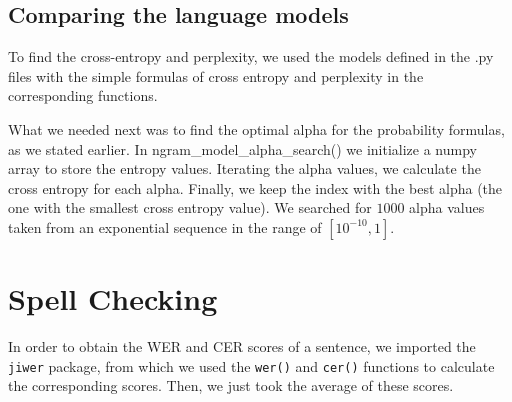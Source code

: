 \documentclass[11pt, a4paper]{article}
\begin{document}
	
	
	
	
	
	
	\subsection{Comparing the language models}
	
	To find the cross-entropy and perplexity, we used the models defined in the .py files with the simple formulas of cross entropy and perplexity in the corresponding functions. 
	
	What we needed next was to find the optimal alpha for the probability formulas, as we stated earlier. In ngram\_model\_alpha\_search() we initialize a numpy array to store the entropy values. Iterating the alpha values, we calculate the cross entropy for each alpha. Finally, we keep the index with the best alpha (the one with the smallest cross entropy value). We searched for $1000$ alpha values taken from an exponential sequence in the range of $[10^{-10}, 1]$.
	
	
	\section{Spell Checking}
	
	In order to obtain the WER and CER scores of a sentence, we imported the \texttt{jiwer} package, from which we used the \texttt{wer()} and \texttt{cer()} functions to calculate the corresponding scores. Then, we just took the average of these scores.
	
	
\end{document}
